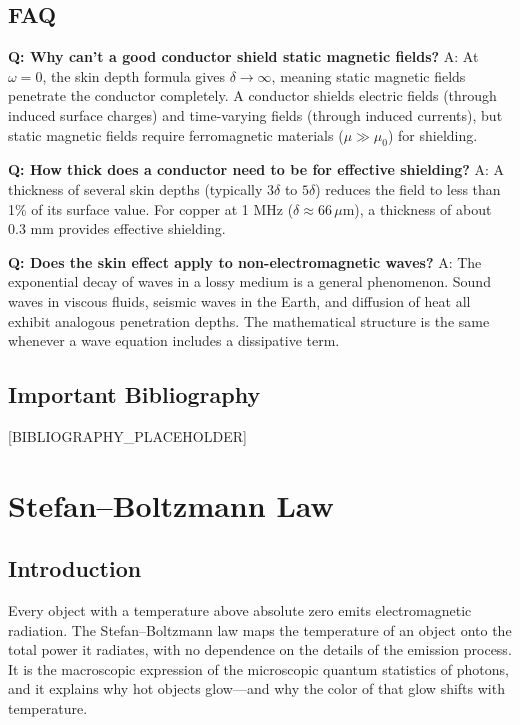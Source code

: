 \documentclass[11pt,openright]{book}
\begin{document}
\section*{FAQ}

\textbf{Q: Why can't a good conductor shield static magnetic fields?}
A: At $\omega = 0$, the skin depth formula gives $\delta \to \infty$, meaning static magnetic fields penetrate the conductor completely. A conductor shields electric fields (through induced surface charges) and time-varying fields (through induced currents), but static magnetic fields require ferromagnetic materials ($\mu \gg \mu_0$) for shielding.

\textbf{Q: How thick does a conductor need to be for effective shielding?}
A: A thickness of several skin depths (typically $3\delta$ to $5\delta$) reduces the field to less than 1\% of its surface value. For copper at 1 MHz ($\delta \approx 66\,\mu$m), a thickness of about 0.3 mm provides effective shielding.

\textbf{Q: Does the skin effect apply to non-electromagnetic waves?}
A: The exponential decay of waves in a lossy medium is a general phenomenon. Sound waves in viscous fluids, seismic waves in the Earth, and diffusion of heat all exhibit analogous penetration depths. The mathematical structure is the same whenever a wave equation includes a dissipative term.
\section*{Important Bibliography}

[BIBLIOGRAPHY_PLACEHOLDER]


\chapter{Stefan--Boltzmann Law}

\section*{Introduction}

Every object with a temperature above absolute zero emits electromagnetic radiation. The Stefan--Boltzmann law maps the temperature of an object onto the total power it radiates, with no dependence on the details of the emission process. It is the macroscopic expression of the microscopic quantum statistics of photons, and it explains why hot objects glow---and why the color of that glow shifts with temperature.
\end{document}

